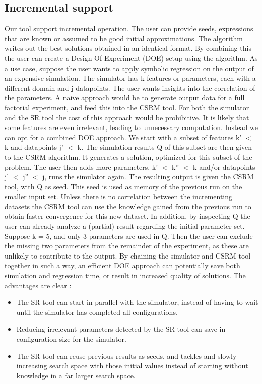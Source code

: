 \subsection{Incremental support}
Our tool support incremental operation. The user can provide seeds, expressions that are known or assumed to be good initial approximations. The algorithm writes out the best solutions obtained in an identical format. By combining this the user can create a Design Of Experiment (DOE) setup using the algorithm. As a use case, suppose the user wants to apply symbolic regression on the output of an expensive simulation. The simulator has k features or parameters, each with a different domain and j datapoints. The user wants insights into the correlation of the parameters. 
A naive approach would be to generate output data for a full factorial experiment, and feed this into the CSRM tool. For both the simulator and the SR tool the cost of this approach would be prohibitive. It is likely that some features are even irrelevant, leading to unnecessary computation. Instead we can opt for a combined DOE approach. We start with a subset of features k' $<$ k and datapoints j' $<$ k. The simulation results Q of this subset are then given to the CSRM algorithm. It generates a solution, optimized for this subset of the problem. 
The user then adds more parameters, k' $<$ k'' $<$ k and/or datapoints j' $<$ j'' $<$ j, runs the simulator again. The resulting output is given the CSRM tool, with Q as seed. This seed is used as memory of the previous run on the smaller input set. Unless there is no correlation between the incrementing datasets the CSRM tool can use the knowledge gained from the previous run to obtain faster convergence for this new dataset. In addition, by inspecting Q the user can already analyze a (partial) result regarding the initial parameter set. Suppose k = 5, and only 3 parameters are used in Q. Then the user can exclude the missing two parameters from the remainder of the experiment, as these are unlikely to contribute to the output.
By chaining the simulator and CSRM tool together in such a way, an efficient DOE approach can potentially save both simulation and regression time, or result in increased quality of solutions. 
The advantages are clear :
\begin{itemize}
\item The SR tool can start in parallel with the simulator, instead of having to wait until the simulator has completed all configurations.
\item Reducing irrelevant parameters detected by the SR tool can save in configuration size for the simulator.
\item The SR tool can reuse previous results as seeds, and tackles and slowly increasing search space with those initial values instead of starting without knowledge in a far larger search space.
\end{itemize}
